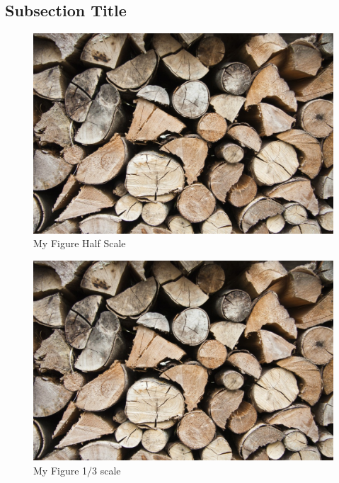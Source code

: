 \documentclass{article}
\begin{document}

\subsection{Subsection Title}

\blindtext
\begin{figure}[t]
  \centering
  \includegraphics[scale=0.5]{eximg01.jpeg}
  \caption{My Figure Half Scale}
  \label{fig:My Fig Half}
\end{figure}
\FloatBarrier


\blindtext
\begin{figure}[t]
  \centering
  \includegraphics[scale=0.3]{eximg01.jpeg}
  \caption{My Figure 1/3 scale}
  \label{fig:My Fig Half}
\end{figure}
\FloatBarrier

\end{document}
